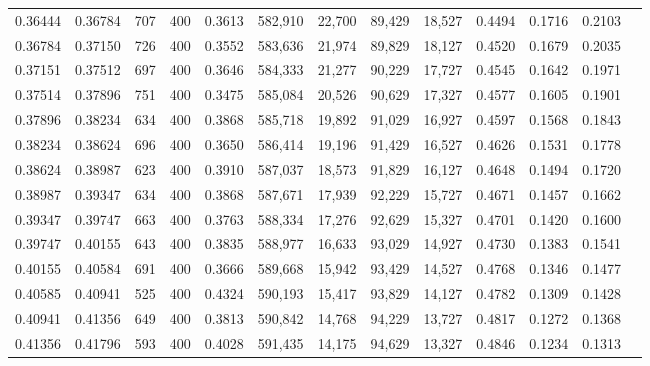 \begin{tabular}{rrrrrrrrrrrrr}
0.36444 & 0.36784 &    707 & 400 &                                     0.3613 & 582,910 &  22,700 &  89,429 &  18,527 & 0.4494 & 0.1716 & 0.2103 \\
0.36784 & 0.37150 &    726 & 400 &                                     0.3552 & 583,636 &  21,974 &  89,829 &  18,127 & 0.4520 & 0.1679 & 0.2035 \\
0.37151 & 0.37512 &    697 & 400 &                                     0.3646 & 584,333 &  21,277 &  90,229 &  17,727 & 0.4545 & 0.1642 & 0.1971 \\
0.37514 & 0.37896 &    751 & 400 &                                     0.3475 & 585,084 &  20,526 &  90,629 &  17,327 & 0.4577 & 0.1605 & 0.1901 \\
0.37896 & 0.38234 &    634 & 400 &                                     0.3868 & 585,718 &  19,892 &  91,029 &  16,927 & 0.4597 & 0.1568 & 0.1843 \\
0.38234 & 0.38624 &    696 & 400 &                                     0.3650 & 586,414 &  19,196 &  91,429 &  16,527 & 0.4626 & 0.1531 & 0.1778 \\
0.38624 & 0.38987 &    623 & 400 &                                     0.3910 & 587,037 &  18,573 &  91,829 &  16,127 & 0.4648 & 0.1494 & 0.1720 \\
0.38987 & 0.39347 &    634 & 400 &                                     0.3868 & 587,671 &  17,939 &  92,229 &  15,727 & 0.4671 & 0.1457 & 0.1662 \\
0.39347 & 0.39747 &    663 & 400 &                                     0.3763 & 588,334 &  17,276 &  92,629 &  15,327 & 0.4701 & 0.1420 & 0.1600 \\
0.39747 & 0.40155 &    643 & 400 &                                     0.3835 & 588,977 &  16,633 &  93,029 &  14,927 & 0.4730 & 0.1383 & 0.1541 \\
0.40155 & 0.40584 &    691 & 400 &                                     0.3666 & 589,668 &  15,942 &  93,429 &  14,527 & 0.4768 & 0.1346 & 0.1477 \\
0.40585 & 0.40941 &    525 & 400 &                                     0.4324 & 590,193 &  15,417 &  93,829 &  14,127 & 0.4782 & 0.1309 & 0.1428 \\
0.40941 & 0.41356 &    649 & 400 &                                     0.3813 & 590,842 &  14,768 &  94,229 &  13,727 & 0.4817 & 0.1272 & 0.1368 \\
0.41356 & 0.41796 &    593 & 400 &                                     0.4028 & 591,435 &  14,175 &  94,629 &  13,327 & 0.4846 & 0.1234 & 0.1313 \\

\end{tabular}
